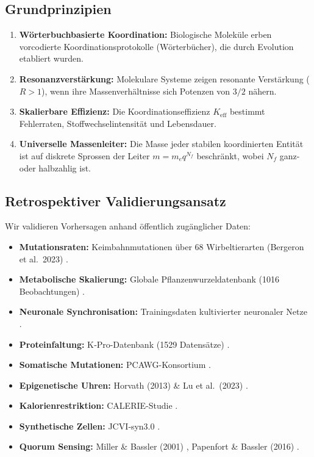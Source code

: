 \documentclass[11pt,a4paper]{article}
\begin{document}
	\subsection{Grundprinzipien}
	
	\begin{enumerate}
		\item \textbf{Wörterbuchbasierte Koordination:} Biologische Moleküle erben vorcodierte Koordinationsprotokolle (Wörterbücher), die durch Evolution etabliert wurden.
		\item \textbf{Resonanzverstärkung:} Molekulare Systeme zeigen resonante Verstärkung (\(R > 1\)), wenn ihre Massenverhältnisse sich Potenzen von \(3/2\) nähern.
		\item \textbf{Skalierbare Effizienz:} Die Koordinationseffizienz \(K_{\mathrm{eff}}\) bestimmt Fehlerraten, Stoffwechselintensität und Lebensdauer.
		\item \textbf{Universelle Massenleiter:} Die Masse jeder stabilen koordinierten Entität ist auf diskrete Sprossen der Leiter \(m = m_e q^{N_f}\) beschränkt, wobei \(N_f\) ganz- oder halbzahlig ist.
	\end{enumerate}
	
	\subsection{Retrospektiver Validierungsansatz}
	
	Wir validieren Vorhersagen anhand öffentlich zugänglicher Daten:
	\begin{itemize}
		\item \textbf{Mutationsraten:} Keimbahnmutationen über 68 Wirbeltierarten (Bergeron et al.\ 2023) \cite{Bergeron2023a}.
		\item \textbf{Metabolische Skalierung:} Globale Pflanzenwurzeldatenbank (1016 Beobachtungen) \cite{Yuan2020}.
		\item \textbf{Neuronale Synchronisation:} Trainingsdaten kultivierter neuronaler Netze \cite{PLOS2025b}.
		\item \textbf{Proteinfaltung:} K‑Pro-Datenbank (1529 Datensätze) \cite{Turina2023}.
		\item \textbf{Somatische Mutationen:} PCAWG-Konsortium \cite{PCAWG2020}.
		\item \textbf{Epigenetische Uhren:} Horvath (2013) \& Lu et al.\ (2023) \cite{Horvath2013, Lu2023}.
		\item \textbf{Kalorienrestriktion:} CALERIE-Studie \cite{CALERIE2018, CALERIE2024}.
		\item \textbf{Synthetische Zellen:} JCVI‑syn3.0 \cite{Hutchison2016, Pelletier2023}.
		\item \textbf{Quorum Sensing:} Miller \& Bassler (2001) \cite{Miller2001}, Papenfort \& Bassler (2016) \cite{Papenfort2016}.
	\end{itemize}
	
\end{document}
